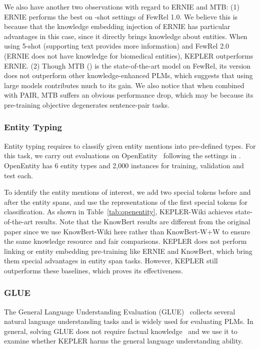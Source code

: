 We also have another two observations with regard to ERNIE and MTB: (1) ERNIE performs the best on -shot settings of FewRel 1.0. We believe this is because that the knowledge embedding injection of ERNIE has particular advantages in this case, since it directly brings knowledge about entities. When using 5-shot (supporting text provides more information) and FewRel 2.0 (ERNIE does not have knowledge for biomedical entities), KEPLER outperforms ERNIE. (2) Though MTB (\BERTLARGE) is the state-of-the-art model on FewRel, its \BERTBASE version does not outperform other knowledge-enhanced PLMs, which suggests that using large models contributes much to its gain. We also notice that when combined with PAIR, MTB suffers an obvious performance drop, which may be because its pre-training objective degenerates sentence-pair tasks.

\subsubsection*{Entity Typing}

Entity typing requires to classify given entity mentions into pre-defined types. For this task, we carry out evaluations on OpenEntity~\citep{choi-etal-2018-ultra} following the settings in \citet{zhang-etal-2019-ernie}. OpenEntity has 6 entity types and 2,000 instances for training, validation and test each.

To identify the entity mentions of interest, we add two special tokens before and after the entity spans, and use the representations of the first special tokens for classification. As shown in Table~\ref{tab:openentity}, KEPLER-Wiki achieves state-of-the-art results. Note that the KnowBert results are different from the original paper since we use KnowBert-Wiki here rather than KnowBert-W+W to ensure the same knowledge resource and fair comparisons. KEPLER does not perform linking or entity embedding pre-training like ERNIE and KnowBert, which bring them special advantages in entity span tasks. However, KEPLER still outperforms these baselines, which proves its effectiveness. 



\subsubsection*{GLUE}

The General Language Understanding Evaluation (GLUE)~\citep{wang-etal-2018-glue} collects several natural language understanding tasks and is widely used for evaluating PLMs. In general, solving GLUE does not require factual knowledge~\citep{zhang-etal-2019-ernie} and we use it to examine whether KEPLER harms the general language understanding ability.

